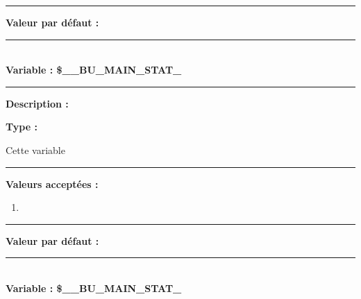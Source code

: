 \documentclass[a4paper,10pt]{article}
\begin{document}
\par\noindent\rule{\textwidth}{0.4pt}

\textbf{Valeur par défaut :}




\color{vars}\par\noindent\rule{\textwidth}{0.4pt}\color{text}\\[1\baselineskip]

\textbf{Variable : \color{vars}\$\_\_BU\_MAIN\_STAT\_}\\[1\baselineskip]

\par\noindent\rule{\textwidth}{0.4pt}

\begin{justify}
    \textbf{Description :}
\end{justify}

\setlength{\parskip}{1em}

\begin{justify}
    \textbf{Type : }
\end{justify}

\setlength{\parskip}{1em}

\begin{justify}
    Cette variable
\end{justify}

\par\noindent\rule{\textwidth}{0.4pt}

\textbf{Valeurs acceptées :}
\begin{enumerate}
    \item
\end{enumerate}

\par\noindent\rule{\textwidth}{0.4pt}

\textbf{Valeur par défaut :}




\color{vars}\par\noindent\rule{\textwidth}{0.4pt}\color{text}\\[1\baselineskip]

\textbf{Variable : \color{vars}\$\_\_BU\_MAIN\_STAT\_}\\[1\baselineskip]
\end{document}
